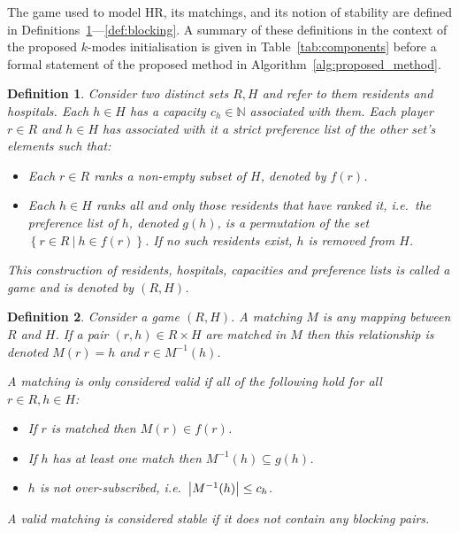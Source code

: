 \documentclass[11pt]{article}
\newtheorem{definition}{Definition}
\DeclarePairedDelimiter\abs{\lvert}{\rvert}%
\begin{document}
The game used to model HR, its matchings, and its notion of stability are
defined in Definitions~\ref{def:game}---\ref{def:blocking}. A summary of these
definitions in the context of the proposed \(k\)-modes initialisation is given
in Table~\ref{tab:components} before a formal statement of the proposed method
in Algorithm~\ref{alg:proposed_method}.

\begin{definition}\label{def:game}
    Consider two distinct sets \(R, H\) and refer to them residents and
    hospitals. Each \(h \in H\) has a capacity \(c_h \in \mathbb{N}\) associated
    with them. Each player \(r \in R\) and \(h \in H\) has associated 
    with it a strict preference list of the other set's elements such that:
    \begin{itemize}
        \item Each \(r \in R\) ranks a non-empty subset of \(H\), denoted by
            \(f(r)\).
        \item Each \(h \in H\) ranks all and only those residents that have
            ranked it, i.e.\ the preference list of \(h\), denoted \(g(h)\), is
            a permutation of the set
            \(\left\{r \in R \ | \ h \in f(r)\right\}\). If no such residents
            exist, \(h\) is removed from \(H\).
    \end{itemize}

    This construction of residents, hospitals, capacities and preference lists
    is called a \emph{game} and is denoted by \((R, H)\).
\end{definition}

\begin{definition}\label{def:matching}
    Consider a game \((R, H)\). A \emph{matching} \(M\) is any mapping between
    \(R\) and \(H\). If a pair \((r, h) \in R \times H\) are matched in \(M\)
    then this relationship is denoted \(M(r) = h\) and \(r \in M^{-1}(h)\).

    A matching is only considered \emph{valid} if all of the following hold for
    all \(r \in R, h \in H\):
    \begin{itemize}
        \item If \(r\) is matched then \(M(r) \in f(r)\).
        \item If \(h\) has at least one match then \(M^{-1}(h) \subseteq g(h)\).
        \item \(h\) is not over-subscribed, i.e.\ \(\abs*{M^{-1}(h)} \leq c_h\).
    \end{itemize}

    A valid matching is considered \emph{stable} if it does not contain any
    blocking pairs.
\end{definition}
\end{document}
